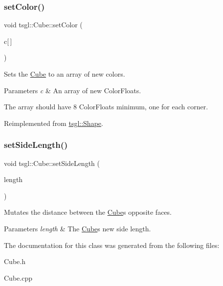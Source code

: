 \subsubsection{\texorpdfstring{set\+Color()}{setColor()}\hspace{0.1cm}{\footnotesize\ttfamily [2/2]}}
{\footnotesize\ttfamily void tsgl\+::\+Cube\+::set\+Color (\begin{DoxyParamCaption}\item[{\hyperlink{structtsgl_1_1_color_float}{Color\+Float}}]{c\mbox{[}$\,$\mbox{]} }\end{DoxyParamCaption})\hspace{0.3cm}{\ttfamily [virtual]}}



Sets the \hyperlink{classtsgl_1_1_cube}{Cube} to an array of new colors. 


\begin{DoxyParams}{Parameters}
{\em c} & An array of new Color\+Floats.\\
\hline
\end{DoxyParams}
The array should have 8 Color\+Floats minimum, one for each corner. 

Reimplemented from \hyperlink{classtsgl_1_1_shape_ad7e554b5d4cea111ec518548b9f21388}{tsgl\+::\+Shape}.

\mbox{\label{classtsgl_1_1_cube_ae3020b2e435f7c39fae71ea4efcc2f6c}} 
\subsubsection{\texorpdfstring{set\+Side\+Length()}{setSideLength()}}
{\footnotesize\ttfamily void tsgl\+::\+Cube\+::set\+Side\+Length (\begin{DoxyParamCaption}\item[{float}]{length }\end{DoxyParamCaption})\hspace{0.3cm}{\ttfamily [virtual]}}



Mutates the distance between the \hyperlink{classtsgl_1_1_cube}{Cube}\textquotesingle{}s opposite faces. 


\begin{DoxyParams}{Parameters}
{\em length} & The \hyperlink{classtsgl_1_1_cube}{Cube}\textquotesingle{}s new side length. \\
\hline
\end{DoxyParams}


The documentation for this class was generated from the following files\+:\begin{DoxyCompactItemize}
\item 
Cube.\+h\item 
Cube.\+cpp\end{DoxyCompactItemize}
